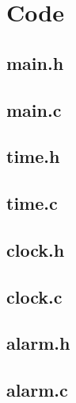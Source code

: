 \documentclass[11pt,a4paper]{scrartcl}
\begin{document}
\newpage

\appendix
\section{Code}

\subsection{main.h}


\subsection{main.c}


\subsection{time.h}


\subsection{time.c}


\subsection{clock.h}


\subsection{clock.c}


\subsection{alarm.h}


\subsection{alarm.c}

\end{document}
